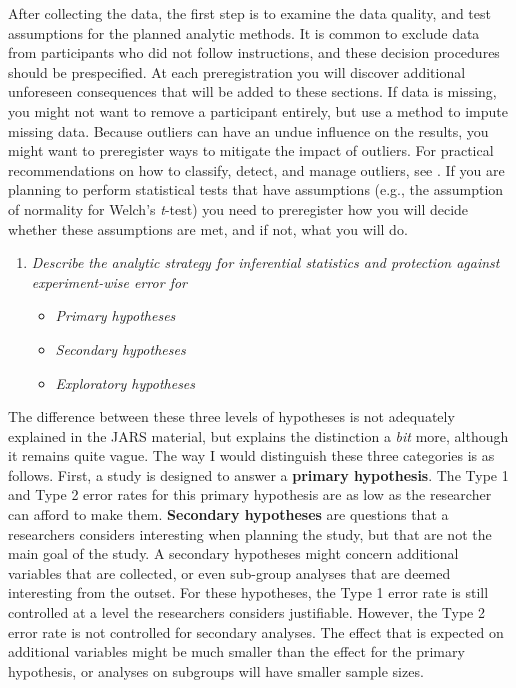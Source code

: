\documentclass[
  oneside]{krantz}
\providecommand{\tightlist}{%
  \setlength{\itemsep}{0pt}\setlength{\parskip}{0pt}}
\begin{document}
After collecting the data, the first step is to examine the data quality, and test assumptions for the planned analytic methods. It is common to exclude data from participants who did not follow instructions, and these decision procedures should be prespecified. At each preregistration you will discover additional unforeseen consequences that will be added to these sections. If data is missing, you might not want to remove a participant entirely, but use a method to impute missing data. Because outliers can have an undue influence on the results, you might want to preregister ways to mitigate the impact of outliers. For practical recommendations on how to classify, detect, and manage outliers, see \citep{leys_how_2019}. If you are planning to perform statistical tests that have assumptions (e.g., the assumption of normality for Welch's \emph{t}-test) you need to preregister how you will decide whether these assumptions are met, and if not, what you will do.

\begin{enumerate}
\def\labelenumi{\arabic{enumi}.}
\setcounter{enumi}{5}
\tightlist
\item
  \emph{Describe the analytic strategy for inferential statistics and protection against experiment-wise error for}

  \begin{itemize}
  \tightlist
  \item
    \emph{Primary hypotheses}
  \item
    \emph{Secondary hypotheses}
  \item
    \emph{Exploratory hypotheses}
  \end{itemize}
\end{enumerate}

The difference between these three levels of hypotheses is not adequately explained in the JARS material, but \citet{cooper_reporting_2020} explains the distinction a \emph{bit} more, although it remains quite vague. The way I would distinguish these three categories is as follows. First, a study is designed to answer a \textbf{primary hypothesis}. The Type 1 and Type 2 error rates for this primary hypothesis are as low as the researcher can afford to make them. \textbf{Secondary hypotheses} are questions that a researchers considers interesting when planning the study, but that are not the main goal of the study. A secondary hypotheses might concern additional variables that are collected, or even sub-group analyses that are deemed interesting from the outset. For these hypotheses, the Type 1 error rate is still controlled at a level the researchers considers justifiable. However, the Type 2 error rate is not controlled for secondary analyses. The effect that is expected on additional variables might be much smaller than the effect for the primary hypothesis, or analyses on subgroups will have smaller sample sizes.
\end{document}
